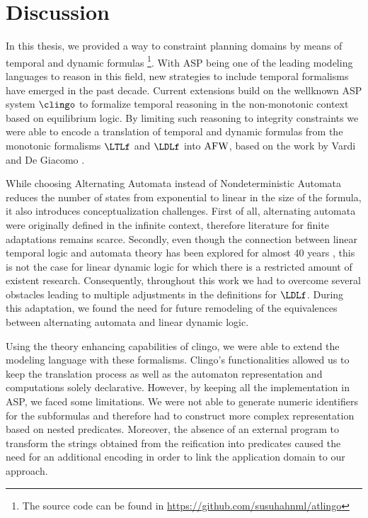 \section{Discussion  }\label{sec:discussion}

In this thesis, we provided a way to constraint planning domains by means of temporal and dynamic formulas \footnote{The source code can be found in \url{https://github.com/susuhahnml/atlingo}}.
With ASP being one of the leading modeling languages to reason in this field, new strategies to include temporal formalisms have emerged in the past decade.
Current extensions build on the wellknown ASP system $\clingo$ to formalize temporal reasoning in the non-monotonic context based on equilibrium logic.
By limiting such reasoning to integrity constraints we were able to encode a translation of temporal and dynamic formulas from the monotonic formalisms $\LTLf$ and $\LDLf$ into $\mathrm{AFW}$, based on the work by Vardi and De Giacomo \cite{giavar15a}. 

While choosing Alternating Automata instead of Nondeterministic Automata reduces the number of states from exponential to linear in the size of the formula, it also introduces conceptualization challenges. First of all, alternating automata were originally defined in the infinite context, therefore literature for finite adaptations remains scarce.
Secondly, even though the connection between linear temporal logic and automata theory has been explored for almost 40 years \cite{varwol86a}, this is not the case for linear dynamic logic for which there is a restricted amount of existent research. 
Consequently, throughout this work we had to overcome several obstacles leading to multiple adjustments in the definitions for $\LDLf$. 
During this adaptation, we found the need for future remodeling of the equivalences between alternating automata and linear dynamic logic. 


Using the theory enhancing capabilities of clingo, we were able to extend the modeling language with these formalisms. Clingo's functionalities allowed us to keep the translation process as well as the automaton representation and computations solely declarative. 
However, by keeping all the implementation in ASP, we faced some limitations. 
We were not able to generate numeric identifiers for the subformulas and therefore had to construct more complex representation based on nested predicates. 
Moreover, the absence of an external program to transform the strings obtained from the reification into predicates caused the need for an additional encoding in order to link the application domain to our approach.

